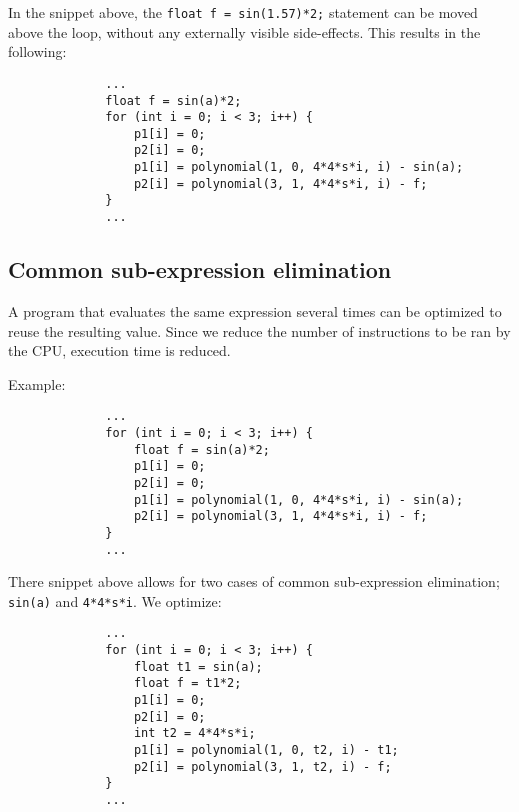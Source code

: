 \documentclass[twoside]{article}
\begin{document}
    In the snippet above, the \texttt{float f = sin(1.57)*2;} statement can be moved above the loop, without any externally visible side-effects.
    This results in the following:

    \begin{figure}[h!]
        \centering
        \begin{verbatim}
        ...
        float f = sin(a)*2;
        for (int i = 0; i < 3; i++) {
            p1[i] = 0;
            p2[i] = 0;
            p1[i] = polynomial(1, 0, 4*4*s*i, i) - sin(a);
            p2[i] = polynomial(3, 1, 4*4*s*i, i) - f;
        }
        ...
        \end{verbatim}
    \end{figure}


    \newpage
    \subsection{Common sub-expression elimination}

    A program that evaluates the same expression several times can be optimized to reuse the resulting value.
    Since we reduce the number of instructions to be ran by the CPU, execution time is reduced.

    Example:

    \begin{figure}[h!]
        \centering
        \begin{verbatim}
        ...
        for (int i = 0; i < 3; i++) {
            float f = sin(a)*2;
            p1[i] = 0;
            p2[i] = 0;
            p1[i] = polynomial(1, 0, 4*4*s*i, i) - sin(a);
            p2[i] = polynomial(3, 1, 4*4*s*i, i) - f;
        }
        ...
        \end{verbatim}
    \end{figure}

    There snippet above allows for two cases of common sub-expression elimination; \texttt{sin(a)} and \texttt{4*4*s*i}.
    We optimize:

    \begin{figure}[h!]
        \centering
        \begin{verbatim}
        ...
        for (int i = 0; i < 3; i++) {
            float t1 = sin(a);
            float f = t1*2;
            p1[i] = 0;
            p2[i] = 0;
            int t2 = 4*4*s*i;
            p1[i] = polynomial(1, 0, t2, i) - t1;
            p2[i] = polynomial(3, 1, t2, i) - f;
        }
        ...
        \end{verbatim}
    \end{figure}
\end{document}
